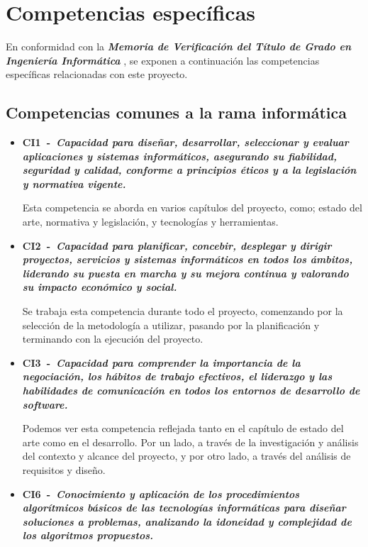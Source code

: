 \section{Competencias específicas}
En conformidad con la \textbf{\emph{Memoria de Verificación del Título de Grado en Ingeniería Informática}} \cite{ulpgc_memoria2019}, se exponen a continuación las competencias específicas relacionadas con este proyecto.

\subsection{Competencias comunes a la rama informática}
\begin{itemize}
    \item \textbf{CI1~-~\emph{Capacidad para diseñar, desarrollar, seleccionar y evaluar aplicaciones y sistemas informáticos, asegurando su fiabilidad, seguridad y calidad, conforme a principios éticos y a la legislación y normativa vigente.}}

    Esta competencia se aborda en varios capítulos del proyecto, como;
    estado del arte, normativa y legislación, y tecnologías y herramientas.

    \item \textbf{CI2~-~\emph{Capacidad para planificar, concebir, desplegar y dirigir proyectos, servicios y sistemas informáticos en todos los ámbitos, liderando su puesta en marcha y su mejora continua y valorando su impacto económico y social.}}

    Se trabaja esta competencia durante todo el proyecto, comenzando por la selección de la metodología a utilizar, pasando por la planificación y terminando con la ejecución del proyecto.

    \item \textbf{CI3~-~\emph{Capacidad para comprender la importancia de la negociación, los hábitos de trabajo efectivos, el liderazgo y las habilidades de comunicación en todos los entornos de desarrollo de software.}}

    Podemos ver esta competencia reflejada tanto en el capítulo de estado del arte como en el desarrollo. Por un lado, a través de la investigación y análisis del contexto y alcance del proyecto, y por otro lado, a través del análisis de requisitos y diseño.
    
    \item \textbf{CI6~-~\emph{Conocimiento y aplicación de los procedimientos algorítmicos básicos de las tecnologías informáticas para diseñar soluciones a problemas, analizando la idoneidad y complejidad de los algoritmos propuestos.}}


\end{itemize}
